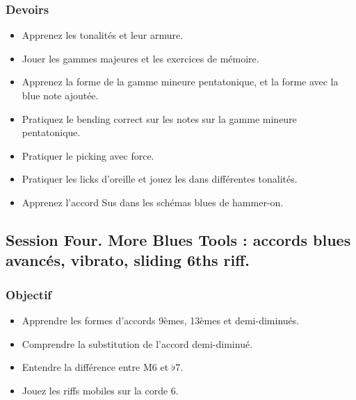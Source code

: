 \documentclass[a4paper]{book}
\begin{document}
\subsubsection{Devoirs}
\begin{itemize}
\item Apprenez les tonalités et leur armure.
\item Jouer les gammes majeures et les exercices de mémoire.
\item Apprenez la forme de la gamme mineure pentatonique, et la forme avec la blue note ajoutée.
\item Pratiquez le bending correct sur les notes sur la gamme mineure pentatonique.
\item Pratiquer le picking avec force.
\item Pratiquer les licks d'oreille et jouez les dans différentes tonalités.
\item Apprenez l'accord Sus dans les schémas blues de hammer-on.
\end{itemize}

\subsection{Session Four. More Blues Tools : accords blues avancés, vibrato, sliding 6ths riff.}


\subsubsection{Objectif}
\begin{itemize}
\item Apprendre les formes d'accords 9èmes, 13èmes et demi-diminués.
\item Comprendre la substitution de l'accord demi-diminué.
\item Entendre la différence entre M6 et $\flat$7.
\item Jouez les riffs mobiles sur la corde 6.
\end{itemize}
\end{document}
